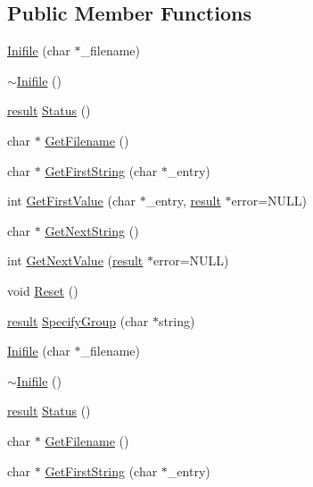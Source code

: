 \subsection*{Public Member Functions}
\begin{DoxyCompactItemize}
\item 
\hyperlink{classInifile_a9680323d455ccc8d035d6bf45faea04e}{Inifile} (char $\ast$\-\_\-filename)
\item 
\hyperlink{classInifile_a5b7f8d5c72e6b7c61773e00252ee347d}{$\sim$\-Inifile} ()
\item 
\hyperlink{classInifile_a42a1cfa6fc8618c8b28d449626f0ecde}{result} \hyperlink{classInifile_a0e2952a53275adcf8bcd027365777b25}{Status} ()
\item 
char $\ast$ \hyperlink{classInifile_a778c149a99636e0e73593a5e0dec2f1e}{Get\-Filename} ()
\item 
char $\ast$ \hyperlink{classInifile_a9287991cc2c90c4c8805a26115960671}{Get\-First\-String} (char $\ast$\-\_\-entry)
\item 
int \hyperlink{classInifile_a874d03d73ed88186a79e86fb79876fc9}{Get\-First\-Value} (char $\ast$\-\_\-entry, \hyperlink{classInifile_a42a1cfa6fc8618c8b28d449626f0ecde}{result} $\ast$error=N\-U\-L\-L)
\item 
char $\ast$ \hyperlink{classInifile_ab8462abdac3d6438f9c458c99e2870e0}{Get\-Next\-String} ()
\item 
int \hyperlink{classInifile_a9b1541b9acc9d672190c8d86428647fc}{Get\-Next\-Value} (\hyperlink{classInifile_a42a1cfa6fc8618c8b28d449626f0ecde}{result} $\ast$error=N\-U\-L\-L)
\item 
void \hyperlink{classInifile_a8184de31b799ff84d413c4d474d43c53}{Reset} ()
\item 
\hyperlink{classInifile_a42a1cfa6fc8618c8b28d449626f0ecde}{result} \hyperlink{classInifile_a1a8d8afddf14a50a9efee618a3ca5bec}{Specify\-Group} (char $\ast$string)
\item 
\hyperlink{classInifile_a9680323d455ccc8d035d6bf45faea04e}{Inifile} (char $\ast$\-\_\-filename)
\item 
\hyperlink{classInifile_a5b7f8d5c72e6b7c61773e00252ee347d}{$\sim$\-Inifile} ()
\item 
\hyperlink{classInifile_a42a1cfa6fc8618c8b28d449626f0ecde}{result} \hyperlink{classInifile_a0e2952a53275adcf8bcd027365777b25}{Status} ()
\item 
char $\ast$ \hyperlink{classInifile_a778c149a99636e0e73593a5e0dec2f1e}{Get\-Filename} ()
\item 
char $\ast$ \hyperlink{classInifile_a46088b8c17e7ed51d9cd4434f100efa8}{Get\-First\-String} (char $\ast$\-\_\-entry)

\end{DoxyCompactItemize}
